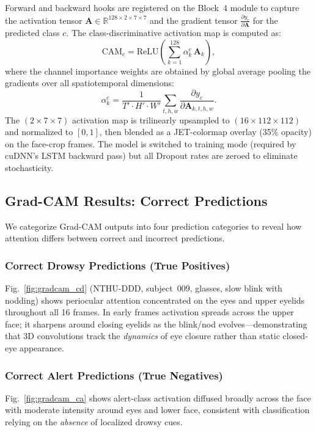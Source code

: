 \documentclass[journal]{IEEEtran}
\begin{document}
Forward and backward hooks are registered on the Block~4 module to capture the activation tensor $\mathbf{A} \in \mathbb{R}^{128 \times 2 \times 7 \times 7}$ and the gradient tensor $\frac{\partial y_c}{\partial \mathbf{A}}$ for the predicted class $c$. The class-discriminative activation map is computed as:
\begin{equation}
\text{CAM}_c = \text{ReLU}\!\left(\sum_{k=1}^{128} \alpha_k^c \, \mathbf{A}_k\right),
\end{equation}
where the channel importance weights are obtained by global average pooling the gradients over all spatiotemporal dimensions:
\begin{equation}
\alpha_k^c = \frac{1}{T' \cdot H' \cdot W'} \sum_{t,h,w} \frac{\partial y_c}{\partial \mathbf{A}_{k,t,h,w}}.
\end{equation}
The $(2\times7\times7)$ activation map is trilinearly upsampled to $(16\times112\times112)$ and normalized to $[0,1]$, then blended as a JET-colormap overlay (35\% opacity) on the face-crop frames. The model is switched to training mode (required by cuDNN's LSTM backward pass) but all Dropout rates are zeroed to eliminate stochasticity.

\subsection{Grad-CAM Results: Correct Predictions}
\label{sec:gradcam_results}

We categorize Grad-CAM outputs into four prediction categories to reveal how attention differs between correct and incorrect predictions.

\subsubsection{Correct Drowsy Predictions (True Positives)}
Fig.~\ref{fig:gradcam_cd} (NTHU-DDD, subject~009, glasses, slow blink with nodding) shows periocular attention concentrated on the eyes and upper eyelids throughout all 16 frames. In early frames activation spreads across the upper face; it sharpens around closing eyelids as the blink/nod evolves---demonstrating that 3D convolutions track the \textit{dynamics} of eye closure rather than static closed-eye appearance.

\subsubsection{Correct Alert Predictions (True Negatives)}
Fig.~\ref{fig:gradcam_ca} shows alert-class activation diffused broadly across the face with moderate intensity around eyes and lower face, consistent with classification relying on the \textit{absence} of localized drowsy cues.
\end{document}
